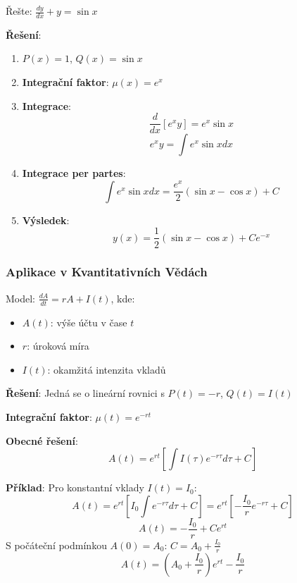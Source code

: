 \begin{example}
Řešte: $\frac{dy}{dx} + y = \sin x$
\vspace{0.3\baselineskip}

\textbf{Řešení}: 
\begin{enumerate}
\item $P(x) = 1$, $Q(x) = \sin x$

\item \textbf{Integrační faktor}: $\mu(x) = e^{x}$

\item \textbf{Integrace}:
\[
\frac{d}{dx}[e^{x}y] = e^{x}\sin x
\]
\[
e^{x}y = \int e^{x}\sin x  dx
\]

\item \textbf{Integrace per partes}:
\[
\int e^{x}\sin x  dx = \frac{e^{x}}{2}(\sin x - \cos x) + C
\]

\item \textbf{Výsledek}:
\[
y(x) = \frac{1}{2}(\sin x - \cos x) + Ce^{-x}
\]
\end{enumerate}
\end{example}

\vspace{0.8\baselineskip}

\subsubsection{Aplikace v Kvantitativních Vědách}
\label{subsubsec:aplikace-kvantitativni}

\begin{application}
Model: $\frac{dA}{dt} = rA + I(t)$, kde:
\begin{itemize}
\item $A(t)$: výše účtu v čase $t$
\item $r$: úroková míra
\item $I(t)$: okamžitá intenzita vkladů
\end{itemize}

\textbf{Řešení}: Jedná se o lineární rovnici s $P(t) = -r$, $Q(t) = I(t)$

\textbf{Integrační faktor}: $\mu(t) = e^{-rt}$

\textbf{Obecné řešení}:
\[
A(t) = e^{rt}\left[\int I(\tau)e^{-r\tau}d\tau + C\right]
\]

\textbf{Příklad}: Pro konstantní vklady $I(t) = I_0$:
\[
A(t) = e^{rt}\left[I_0\int e^{-r\tau}d\tau + C\right] = e^{rt}\left[-\frac{I_0}{r}e^{-r\tau} + C\right]
\]
\[
A(t) = -\frac{I_0}{r} + Ce^{rt}
\]
S počáteční podmínkou $A(0) = A_0$: $C = A_0 + \frac{I_0}{r}$
\[
A(t) = \left(A_0 + \frac{I_0}{r}\right)e^{rt} - \frac{I_0}{r}
\]
\end{application}

